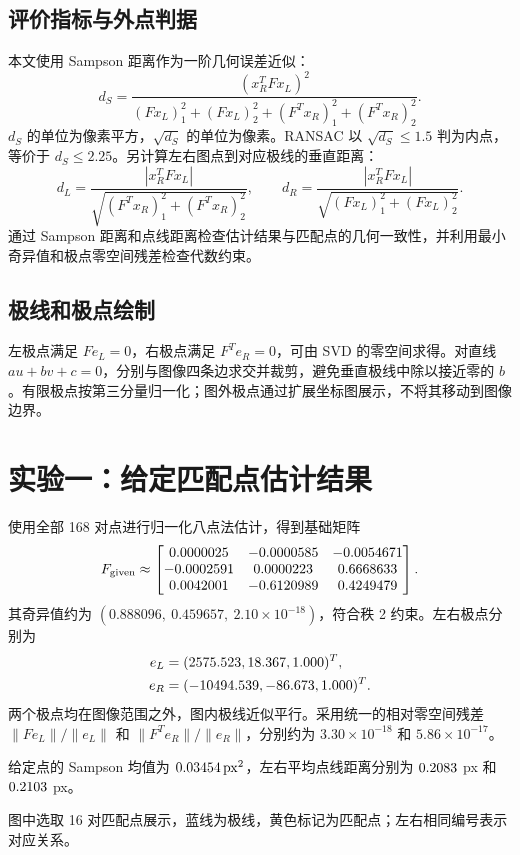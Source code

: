 \documentclass[UTF8,a4paper,zihao=-4,fontset=windows]{ctexart}
\begin{document}
\subsection{评价指标与外点判据}
本文使用 Sampson 距离作为一阶几何误差近似：
\begin{equation}
d_S=\frac{(x_R^TFx_L)^2}
{(Fx_L)_1^2+(Fx_L)_2^2+(F^Tx_R)_1^2+(F^Tx_R)_2^2}.
\end{equation}
$d_S$ 的单位为像素平方，$\sqrt{d_S}$ 的单位为像素。RANSAC 以 $\sqrt{d_S}\leq1.5$ 判为内点，等价于 $d_S\leq2.25$。另计算左右图点到对应极线的垂直距离：
\begin{equation}
d_L=\frac{|x_R^TFx_L|}{\sqrt{(F^Tx_R)_1^2+(F^Tx_R)_2^2}},\qquad
d_R=\frac{|x_R^TFx_L|}{\sqrt{(Fx_L)_1^2+(Fx_L)_2^2}}.
\end{equation}
通过 Sampson 距离和点线距离检查估计结果与匹配点的几何一致性，并利用最小奇异值和极点零空间残差检查代数约束。

\subsection{极线和极点绘制}
左极点满足 $Fe_L=0$，右极点满足 $F^Te_R=0$，可由 SVD 的零空间求得。对直线 $au+bv+c=0$，分别与图像四条边求交并裁剪，避免垂直极线中除以接近零的 $b$。有限极点按第三分量归一化；图外极点通过扩展坐标图展示，不将其移动到图像边界。

\clearpage
\section{实验一：给定匹配点估计结果}
使用全部 168 对点进行归一化八点法估计，得到基础矩阵
\begin{equation}
F_{\mathrm{given}}\approx\begin{bmatrix}0.0000025 & -0.0000585 & -0.0054671\\-0.0002591 & 0.0000223 & 0.6668633\\0.0042001 & -0.6120989 & 0.4249479\end{bmatrix}.
\end{equation}
其奇异值约为 $(0.888096,\ 0.459657,\ 2.10\times10^{-18})$，符合秩 2 约束。左右极点分别为
\begin{align}
e_L&=(2575.523, 18.367, 1.000)^T,\\
e_R&=(-10494.539, -86.673, 1.000)^T.
\end{align}
两个极点均在图像范围之外，图内极线近似平行。采用统一的相对零空间残差 $\lVert Fe_L\rVert/\lVert e_L\rVert$ 和 $\lVert F^Te_R\rVert/\lVert e_R\rVert$，分别约为 $3.30\times10^{-18}$ 和 $5.86\times10^{-17}$。

给定点的 Sampson 均值为 $0.03454\,\mathrm{px}^2$，左右平均点线距离分别为 $0.2083$ px 和 $0.2103$ px。

图中选取 16 对匹配点展示，蓝线为极线，黄色标记为匹配点；左右相同编号表示对应关系。
\end{document}
